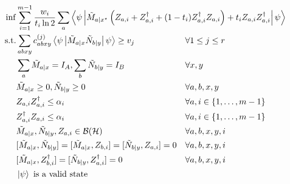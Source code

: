 \documentclass[10pt, a4paper]{article}
\numberwithin{equation}{section} %
\theoremstyle{definition}
\theoremstyle{plain}
\newcommand{\dintv}[2]{\mathopen\{#1,\ldots,#2\mathclose\}}
\newcommand{\?}{\mathrel{?}} %
\newcommand{\angleb}[1]{\left\langle #1 \right\rangle} %
\newcommand{\Hs}{\mathcal{H}} %
\newcommand{\sB}{\mathcal{B}}
\begin{document}
      \begin{equation}
        \begin{aligned}[c]
          \inf & \sum_{i=1}^{m-1} \frac{w_i}{t_i \ln 2} \sum_a \angleb{\psi\left|
          \tilde{M}_{a|x^{\star}} \left( Z_{a,i} + Z_{a,i}^{\dagger} + (1-t_i)  Z_{a,i}^{\dagger}Z_{a,i}\right) + t_i Z_{a,i}Z_{a,i}^{\dagger} \right|\psi} \\
            \text{s.t.} & \begin{aligned}[t] 
          & \sum_{abxy} c^{(j)}_{abxy} \angleb{\psi\left| \tilde{M}_{a|x} \tilde{N}_{b|y} \right|\psi} \geq v_j & & \forall 1 \leq j \leq r \\
          & \sum_{a} \tilde{M}_{a|x} = I_{A}, \sum_{b} \tilde{N}_{b|y} = I_{B} & & \forall x, y \\
          & \tilde{M}_{a|x} \geq 0, \tilde{N}_{b|y} \geq 0 & & \forall a, b, x, y \\
          & Z_{a,i} Z_{a,i}^{\dagger} \leq \alpha_i & & \forall a, i \in \dintv{1}{m-1} \\
          & Z_{a,i}^{\dagger} Z_{a,i} \leq \alpha_i & & \forall a, i \in \dintv{1}{m-1} \\
          & \tilde{M}_{a|x}, \tilde{N}_{b|y}, Z_{a,i} \in \sB(\Hs) & & \forall a, b, x, y, i \\
          & [\tilde{M}_{a|x}, \tilde{N}_{b|y}] = [\tilde{M}_{a|x}, Z_{b,i}] = [\tilde{N}_{b|y}, Z_{a,i}] = 0 & & \forall a, b, x, y, i \\
          & [\tilde{M}_{a|x}, Z_{b,i}^{\dagger}] = [\tilde{N}_{b|y}, Z_{a,i}^{\dagger}] = 0 & & \forall a, b, x, y, i \\
          & \ket{\psi} \text{ is a valid state} & & \\
            \end{aligned}
        \end{aligned}
      \end{equation}
\end{document}
